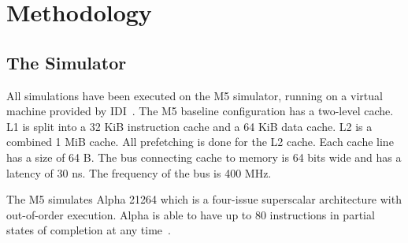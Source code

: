 \section{Methodology} %


\subsection{The Simulator}

All simulations have been executed on the M5 simulator, running on a
virtual machine provided by IDI~\cite{idi}.  The M5 baseline
configuration has a two-level cache. L1 is split into a 32 KiB
instruction cache and a 64 KiB data cache. L2 is a combined 1 MiB
cache. All prefetching is done for the L2 cache. Each cache line has a
size of 64 B. The bus connecting cache to memory is 64 bits wide and
has a latency of 30 ns. The frequency of the bus is 400 MHz.

The M5 simulates Alpha 21264 which is a four-issue superscalar
architecture with out-of-order execution. Alpha is able to have up to
80 instructions in partial states of completion at any
time~\cite{kessler_1999}.

